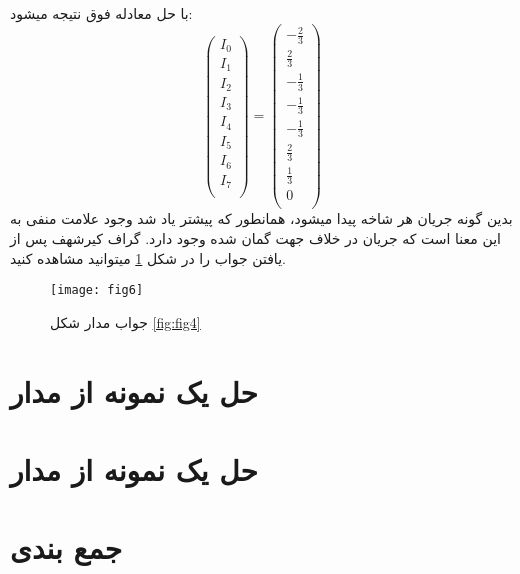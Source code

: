 با حل معادله فوق نتیجه میشود:
 \begin{equation}
	\begin{pmatrix}
		I_0\\
		I_1\\
		I_2\\
		I_3\\
		I_4\\
		I_5\\
		I_6\\
		I_7\\
	\end{pmatrix}
	=
	\begin{pmatrix}
		-\frac{2}{3}\\
		\frac{2}{3}\\
		-\frac{1}{3}\\
		-\frac{1}{3}\\
		-\frac{1}{3}\\
		\frac{2}{3}\\
		\frac{1}{3}\\
		0\\
	\end{pmatrix}
\end{equation}
بدین گونه جریان هر شاخه پیدا میشود، همانطور که پیشتر یاد شد وجود علامت منفی به این 
معنا است که جریان در خلاف جهت گمان شده وجود دارد.
گراف کیرشهف پس از یافتن جواب را در شکل
\ref{fig:fig6}
 میتوانید مشاهده کنید.
\begin{figure}[ht]
	\centerline{\texttt{[image: fig6]}}
	\caption{جواب مدار شکل
		\ref{fig:fig4}	
	}
	\label{fig:fig6}
\end{figure}

\section{حل یک نمونه از مدار
 }

\section{حل یک نمونه از مدار
	 }

\section{جمع بندی}